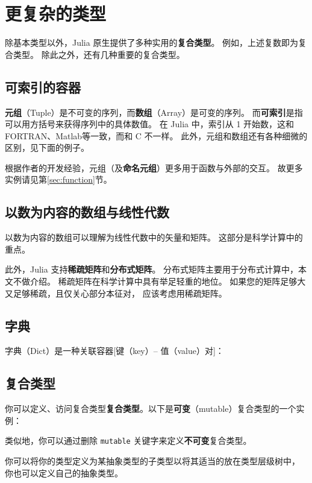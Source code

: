 \documentclass[10pt,a4paper]{article}
\begin{document}
\section{更复杂的类型}
除基本类型以外，Julia 原生提供了多种实用的\textbf{复合类型}。
例如，上述复数即为复合类型。
除此之外，还有几种重要的复合类型。

\subsection{可索引的容器}
\textbf{元组}（Tuple）是不可变的序列，而\textbf{数组}（Array）是可变的序列。
而\textbf{可索引}是指可以用方括号来获得序列中的具体数值。
在 Julia 中，索引从 1 开始数，这和 FORTRAN、Matlab等一致，而和 C 不一样。
此外，元组和数组还有各种细微的区别，见下面的例子。


根据作者的开发经验，元组（及\textbf{命名元组}）更多用于函数与外部的交互。
故更多实例请见第\ref{sec:function}节。

\subsection{以数为内容的数组与线性代数}
以数为内容的数组可以理解为线性代数中的矢量和矩阵。
这部分是科学计算中的重点。


此外，Julia 支持\textbf{稀疏矩阵}和\textbf{分布式矩阵}。
分布式矩阵主要用于分布式计算中，本文不做介绍。
稀疏矩阵在科学计算中具有举足轻重的地位。
如果您的矩阵足够大又足够稀疏，且仅关心部分本征对，
应该考虑用稀疏矩阵。


\subsection{字典}
字典（Dict）是一种关联容器[键（key）-- 值（value）对]：



\subsection{复合类型}
你可以定义、访问复合类型\textbf{复合类型}。以下是\textbf{可变}（mutable）复合类型的一个实例：


类似地，你可以通过删除 \lstinline|mutable| 关键字来定义\textbf{不可变}复合类型。 

你可以将你的类型定义为某抽象类型的子类型以将其适当的放在类型层级树中，
你也可以定义自己的抽象类型。
\end{document}
